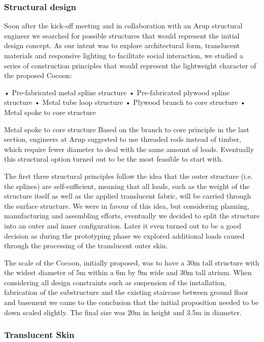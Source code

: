 \subsubsection*{Structural design}

Soon after the kick-off meeting and in collaboration with an Arup structural engineer we searched for possible structures that would represent the initial design concept. As our intent was to explore architectural form, translucent materials and responsive lighting to facilitate social interaction, we studied a series of construction principles that would represent the lightweight character of the proposed Cocoon:

•	Pre-fabricated metal spline structure
•	Pre-fabricated plywood spline structure
•	Metal tube loop structure
•	Plywood branch to core structure
•	Metal spoke to core structure

Metal spoke to core structure  
Based on the branch to core principle in the last section, engineers at Arup suggested to use threaded rods instead of timber, which require fewer diameter to deal with the same amount of loads. Eventually this structural option turned out to be the most feasible to start with. 

The first three structural principles follow the idea that the outer structure (i.e. the splines) are self-sufficient, meaning that all loads, such as the weight of the structure itself as well as the applied translucent fabric, will be carried through the surface structure. We were in favour of this idea, but considering planning, manufacturing and assembling efforts, eventually we decided to split the structure into an outer and inner configuration. Later it even turned out to be a good decision as during the prototyping phase we explored additional loads caused through the processing of the translucent outer skin.        

The scale of the Cocoon, initially proposed, was to have a 30m tall structure with the widest diameter of 5m within a 6m by 9m wide and 30m tall atrium. When considering all design constraints such as suspension of the installation, fabrication of the substructure and the existing staircase between ground floor and basement we came to the conclusion that the initial proposition needed to be down scaled slightly. The final size was 20m in height and 3.5m in diameter.

\subsubsection*{Translucent Skin}

